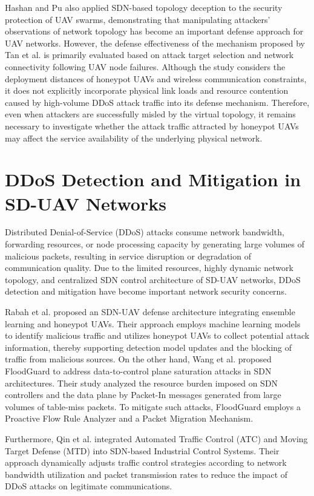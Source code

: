 \begin{ZhChapter}
Hashan and Pu \cite{hashan:2026} also applied SDN-based topology deception to the security protection of UAV swarms, demonstrating that manipulating attackers' observations of network topology has become an important defense approach for UAV networks. However, the defense effectiveness of the mechanism proposed by Tan et al. \cite{tan:2022} is primarily evaluated based on attack target selection and network connectivity following UAV node failures. Although the study considers the deployment distances of honeypot UAVs and wireless communication constraints, it does not explicitly incorporate physical link loads and resource contention caused by high-volume DDoS attack traffic into its defense mechanism. Therefore, even when attackers are successfully misled by the virtual topology, it remains necessary to investigate whether the attack traffic attracted by honeypot UAVs may affect the service availability of the underlying physical network.

\section{DDoS Detection and Mitigation in SD-UAV Networks}

Distributed Denial-of-Service (DDoS) attacks consume network bandwidth, forwarding resources, or node processing capacity by generating large volumes of malicious packets, resulting in service disruption or degradation of communication quality. Due to the limited resources, highly dynamic network topology, and centralized SDN control architecture of SD-UAV networks, DDoS detection and mitigation have become important network security concerns.

Rabah et al. \cite{ouldrabah:2024} proposed an SDN-UAV defense architecture integrating ensemble learning and honeypot UAVs. Their approach employs machine learning models to identify malicious traffic and utilizes honeypot UAVs to collect potential attack information, thereby supporting detection model updates and the blocking of traffic from malicious sources. On the other hand, Wang et al. \cite{wang:2015} proposed FloodGuard to address data-to-control plane saturation attacks in SDN architectures. Their study analyzed the resource burden imposed on SDN controllers and the data plane by Packet-In messages generated from large volumes of table-miss packets. To mitigate such attacks, FloodGuard employs a Proactive Flow Rule Analyzer and a Packet Migration Mechanism.

Furthermore, Qin et al. \cite{qin:2025} integrated Automated Traffic Control (ATC) and Moving Target Defense (MTD) into SDN-based Industrial Control Systems. Their approach dynamically adjusts traffic control strategies according to network bandwidth utilization and packet transmission rates to reduce the impact of DDoS attacks on legitimate communications.


\end{ZhChapter}
